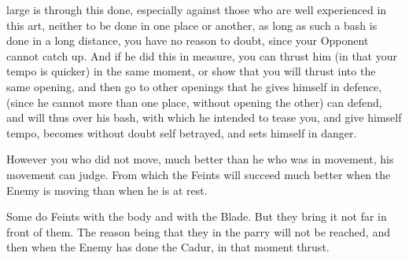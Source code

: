 \newpage


\newpage


large is through this done, especially against those who are
well experienced in this art, neither to be done in one place or another, as
long as such a bash is done in a long distance, you have no reason to
doubt, since your Opponent cannot catch up. And if he did this in
measure, you can thrust him (in that your tempo is quicker) in the same
moment, or show that you will thrust into the same opening, and
then go to other openings that he gives himself in defence, (since he
cannot more than one place, without opening the other) can defend, and
will thus over his bash, with which he intended to tease you, and give
himself tempo, becomes without doubt self betrayed, and sets himself
in danger.


However you who did not move, much better than he who was in
movement, his movement can judge. From which the Feints will succeed
much better when the Enemy is moving than when he is at rest.


Some do Feints with the body and with the Blade. But they bring it not
far in front of them. The reason being that they in the parry will not
be reached, and then when the Enemy has done the Cadur, in that moment
thrust.

